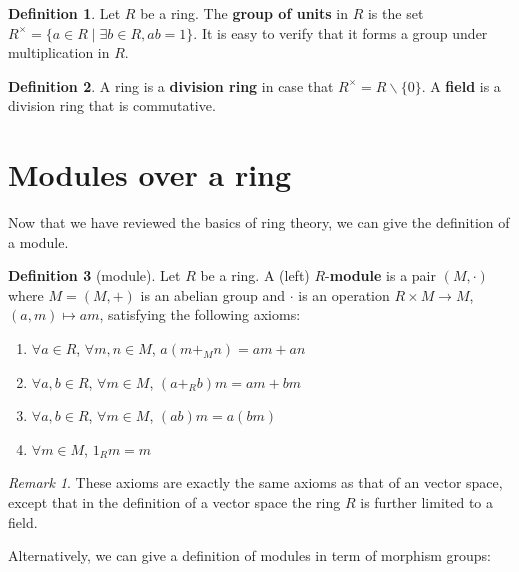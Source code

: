 \documentclass[12pt, a4paper, titlepage]{report}
\theoremstyle{plain} %
\theoremstyle{definition}
\newtheorem{defn}{Definition}[section]
\theoremstyle{remark}
\newtheorem*{rem}{Remark}
\begin{document}
\begin{defn}
  Let $R$ be a ring. The \textbf{group of units} in $R$ is the set
  $R^{\times} = \{ a \in R \mid \exists b \in R, ab = 1 \}$. It is easy to
  verify that it forms a group under multiplication in $R$.
\end{defn}

\begin{defn}
  A ring is a \textbf{division ring} in case that $R^{\times} = R \backslash \{0\}$.
  A \textbf{field} is a division ring that is commutative.
\end{defn}

\section{Modules over a ring}
Now that we have reviewed the basics of ring theory, we can give the definition of a module.

\begin{defn}[module]
  Let $R$ be a ring. A (left) $R$-\textbf{module} is a pair $(M, \cdot)$ where $M = (M, +)$ is an abelian group
  and $\cdot$ is an operation $R \times M \rightarrow M$, $(a, m) \mapsto am$, satisfying the
  following axioms:
  \begin{enumerate}
  \item $\forall a \in R$, $\forall m, n \in M$, $a(m +_{M} n) = am + an$
  \item $\forall a, b \in R$, $\forall m \in M$, $(a +_{R} b)m = am + bm$
  \item $\forall a, b \in R$, $\forall m \in M$, $(ab)m = a(bm)$
  \item $\forall m \in M$, $1_{R}m = m$
  \end{enumerate}
\end{defn}

\begin{rem}
  These axioms are exactly the same axioms as that of an vector space, except that in the definition of a vector space
  the ring $R$ is further limited to a field. 
\end{rem}

Alternatively, we can give a definition of modules in term of morphism groups:
\end{document}
